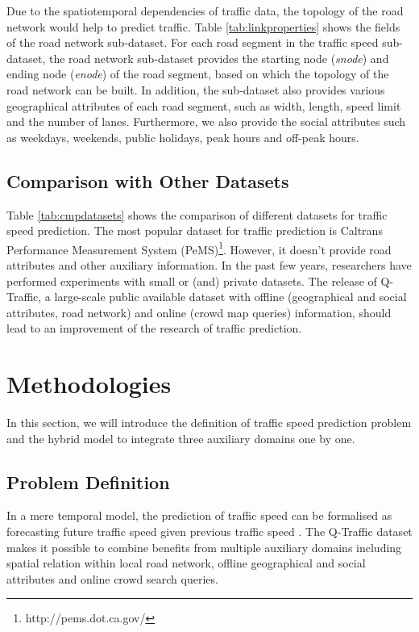 Due to the spatiotemporal dependencies of traffic data, the topology of the road network would help to predict traffic. Table \ref{tab:linkproperties} shows the fields of the road network sub-dataset. For each road segment in the traffic speed sub-dataset, the road network sub-dataset provides the starting node (\textit{snode}) and ending node (\textit{enode}) of the road segment, based on which the topology of the road network can be built. In addition, the sub-dataset also provides various geographical attributes of each road segment, such as width, length, speed limit and the number of lanes. Furthermore, we also provide the social attributes such as weekdays, weekends, public holidays, peak hours and off-peak hours.

\subsection{Comparison with Other Datasets}

Table \ref{tab:cmpdatasets} shows the comparison of different datasets for traffic speed prediction. The most popular dataset for traffic prediction is Caltrans Performance Measurement System (PeMS)\footnote{http://pems.dot.ca.gov/}. However, it doesn't provide road attributes and other auxiliary information. In the past few years, researchers have performed experiments with small or (and) private datasets. The release of Q-Traffic, a large-scale public available dataset with offline (geographical and social attributes, road network) and online (crowd map queries) information, should lead to an improvement of the research of traffic prediction.


\section{Methodologies}
\label{methods}
In this section, we will introduce the definition of traffic speed prediction problem and the hybrid model to integrate three auxiliary domains one by one.

\subsection{Problem Definition}
In a mere temporal model, the prediction of traffic speed can be formalised as forecasting future traffic speed  given previous traffic speed . The Q-Traffic dataset makes it possible to combine benefits from multiple auxiliary domains including spatial relation within local road network, offline geographical and social attributes and online crowd search queries. 

